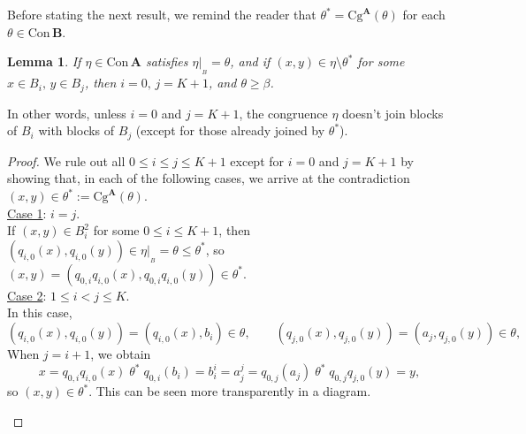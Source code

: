 \documentclass[cm,dissertation,actual,final]{uhthesis}
\theoremstyle{plain}
\newtheorem{lemma}[theorem]{Lemma}
\theoremstyle{definition}
\theoremstyle{remark}
\numberwithin{theorem}{section}
\numberwithin{claim}{chapter}
\numberwithin{equation}{section}
\numberwithin{conjecture}{chapter}
\newcommand{\<}{\ensuremath{\langle}}
\renewcommand{\>}{\ensuremath{\rangle}}
\renewcommand{\leq}{\ensuremath{\leqslant}}
\renewcommand{\geq}{\ensuremath{\geqslant}}
\newcommand{\Cg}{\ensuremath{\mathrm{Cg}}}
\newcommand{\Con}{\ensuremath{\mathrm{Con\,}}}
\newcommand{\0}{\ensuremath{\mathbf{0}}}
\newcommand{\1}{\ensuremath{\mathbf{1}}}
\newcommand{\2}{\ensuremath{\mathbf{2}}}
\newcommand{\3}{\ensuremath{\mathbf{3}}}
\newcommand{\4}{\ensuremath{\mathbf{4}}}
\newcommand{\5}{\ensuremath{\mathbf{5}}}
\newcommand{\bA}{\ensuremath{\mathbf{A}}}
\newcommand{\bB}{\ensuremath{\mathbf{B}}}
\newcommand{\resB}{\ensuremath{|_{_B}}}
\begin{document}
Before stating the next result, we remind the reader that %
$\theta^* = \Cg^\bA(\theta)$ for each $\theta \in \Con\bB$. 
\begin{lemma}
  \label{lem3.1}
  If $\eta \in \Con\bA$ satisfies $\eta\resB =
  \theta$, and if $(x,y) \in \eta \setminus \theta^*$ for some 
  $x\in B_i, \, y\in B_j$, then $i=0, \, j=K+1$, and $\theta \geq \beta$.
\end{lemma}
In other words, unless $i=0$ and $j=K+1$, the congruence $\eta$ doesn't join blocks
of $B_i$ with blocks of $B_j$ (except for those already joined by
$\theta^*$).
\begin{proof}
  We rule out all $0\leq i \leq j \leq K+1$ except for $i=0$ and $j=K+1$ by
  showing that, in each of the following cases, we arrive at the contradiction
  $(x,y)\in \theta^*:= \Cg^\bA(\theta)$.\\[6pt]
  \underline{Case 1}: $i=j$.\\[4pt]
  If $(x,y)\in B_i^2$ for some $0\leq i \leq K+1$, then
  $(q_{i,0}(x),q_{i,0}(y))\in \eta\resB = \theta \leq \theta^*$, so 
  $(x,y) = (q_{0,i} q_{i,0}(x),q_{0,i} q_{i,0}(y))\in \theta^*$.
  \\[6pt]
  \underline{Case 2}: $1\leq i < j \leq K$.\\[4pt]
  In this case,
  \[ %
  (q_{i,0}(x),q_{i,0}(y)) = 
  (q_{i,0}(x), b_{i})\in \theta, \qquad
  (q_{j,0}(x),q_{j,0}(y))= (a_{j},q_{j,0}(y))\in\theta,
  \] %
  When $j= i+1$, we obtain
  \begin{equation}
    \label{eq:OA4}
    x = q_{0,i}q_{i,0}(x)\; \theta^* \; q_{0,i}(b_i) = b_i^i = a^j_j = q_{0,j}(a_j) \;
    \theta^* \; q_{0,j} q_{j,0}(y) = y,
  \end{equation}
  so $(x,y)\in \theta^*$.  
  This can be seen more transparently in a diagram.
  \begin{center}
    
\end{center}
\end{proof}
\end{document}
